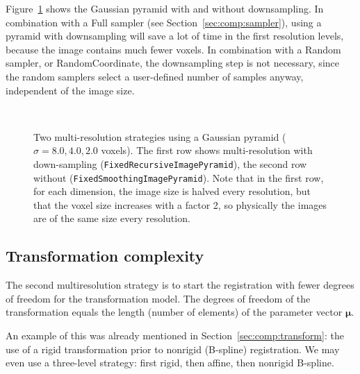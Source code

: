 \documentclass[]{report}
\newcommand{\vmu}{\bm{\mu}}
\begin{document}
Figure~\ref{fig:multiresolution} shows the Gaussian pyramid with and
without downsampling. In combination with a Full sampler (see
Section~\ref{sec:comp:sampler}), using a pyramid with downsampling
will save a lot of time in the first resolution levels, because the
image contains much fewer voxels. In combination with a Random
sampler, or RandomCoordinate, the downsampling step is not necessary,
since the random samplers select a user-defined number of samples
anyway, independent of the image size.

\begin{figure}[tb]
\centering {}
 \\
\caption{Two multi-resolution strategies using a Gaussian pyramid
($\sigma = 8.0, 4.0, 2.0$ voxels). The first row shows
multi-resolution with down-sampling
(\texttt{FixedRecursiveImagePyramid}), the second row without
(\texttt{FixedSmoothingImagePyramid}). Note that in the first row,
for each dimension, the image size is halved every resolution, but
that the voxel size increases with a factor 2, so physically the
images are of the same size every resolution.}
\label{fig:multiresolution}
\end{figure}

\subsection{Transformation complexity}

The second multiresolution strategy is to start the registration
with fewer degrees of freedom for the transformation model. The
degrees of freedom of the transformation equals the length (number
of elements) of the parameter vector $\vmu$.

An example of this was already mentioned in Section~\ref{sec:comp:transform}:
the use of a rigid transformation prior to nonrigid (B-spline) registration. We
may even use a three-level strategy: first rigid, then affine, then nonrigid
B-spline.
\end{document}
